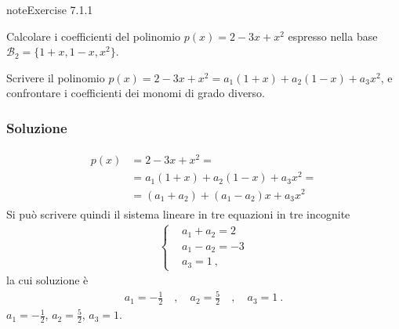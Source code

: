 \documentclass[letterpaper,10pt,italian]{jupyterBook}
\begin{document}
\begin{sphinxadmonition}{note}{Exercise 7.1.1}



\sphinxAtStartPar
Calcolare i coefficienti del polinomio \(p(x) = 2 - 3 x + x^2\) espresso nella base \(\mathcal{B}_2 = \{ 1+x, 1-x, x^2 \}\).

\sphinxAtStartPar
{} Scrivere il polinomio \(p(x) = 2 - 3 x + x^2 = a_1 ( 1 + x ) + a_2 ( 1 - x ) + a_3 x^2\), e confrontare i coefficienti dei monomi di grado diverso.
\subsubsection*{Soluzione}
\begin{equation*}
\begin{split}\begin{aligned}
  p(x)
  & = 2 - 3 x + x^2 = \\
  & = a_1 ( 1 + x ) + a_2 ( 1 - x ) + a_3 x^2 = \\
  & = ( a_1 + a_2 ) + ( a_1 - a_2 ) x + a_3 x^2 \ 
\end{aligned}\end{split}
\end{equation*}
\sphinxAtStartPar
Si può scrivere quindi il sistema lineare in tre equazioni in tre incognite
\begin{equation*}
\begin{split}\left\{
\begin{aligned}
  & a_1 + a_2 = 2 \\
  & a_1 - a_2 = -3 \\
  & a_3 = 1 \ ,
\end{aligned} 
\right.\end{split}
\end{equation*}
\sphinxAtStartPar
la cui soluzione è
\begin{equation*}
\begin{split}a_1 = -\frac{1}{2} \quad , \quad a_2 = \frac{5}{2} \quad , \quad a_3 =  1 \ .\end{split}
\end{equation*}
\sphinxAtStartPar
{} \(a_1 = - \frac{1}{2}\), \(a_2 = \frac{5}{2}\), \(a_3 = 1\).
\end{sphinxadmonition}
\label{ch/algebra/vector-algebra-def:example-8}
\end{document}
